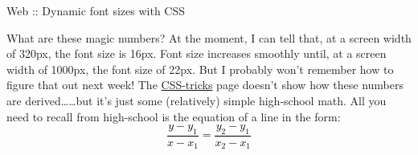 \begin{frame}{Web :: Dynamic font sizes with CSS}
{\begin{enumerate}[<+-| alert@+>]
\begin{center}
                \end{center}
                What are these magic numbers? At the moment, I can tell that, at a screen width of 320px, the font size is 16px. Font size increases smoothly until, at a screen width of 1000px, the font size of 22px. But I probably won't remember how to figure that out next week! The \href{https://css-tricks.com/snippets/css/fluid-typography/}{CSS-tricks} page doesn't show how these numbers are derived\ldots \pars \ldots but it's just some (relatively) simple high-school math. All you need to recall from high-school is the equation of a line in the form:
                \textcolor{black}{$$\frac{y-y_1}{x-x_1}=\frac{y_2-y_1}{x_2-x_1}$$}
        \end{enumerate}
    }
\end{frame}
